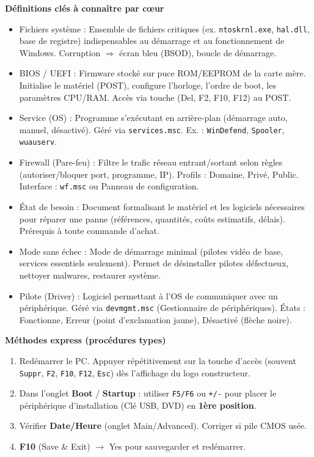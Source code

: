 \documentclass[11pt]{article}
\newcommand{\cle}[1]{{\popxbold\color{popdark}#1}}
\newcounter{popsec}
\newcounter{popsub}
\newcommand{\courssub}[1]{%
  \stepcounter{popsub}%
  \par\vspace{9pt}\noindent{\popxbold\fontsize{11.5}{13}\selectfont\color{popink}{\color{poporange}\thepopsec.\thepopsub}\hspace{6pt}#1}\par\nopagebreak\vspace{4pt}
}
\begin{document}
\courssub{Bilan synthétique}

\begin{bilan}

\textbf{Définitions clés à connaître par cœur}
\begin{itemize}
    \item \cle{Fichiers système} : Ensemble de fichiers critiques (ex. \texttt{ntoskrnl.exe}, \texttt{hal.dll}, base de registre) indispensables au démarrage et au fonctionnement de Windows. Corruption $\Rightarrow$ écran bleu (BSOD), boucle de démarrage.
    \item \cle{BIOS / UEFI} : Firmware stocké sur puce ROM/EEPROM de la carte mère. Initialise le matériel (POST), configure l'horloge, l'ordre de boot, les paramètres CPU/RAM. Accès via touche (Del, F2, F10, F12) au POST.
    \item \cle{Service (OS)} : Programme s'exécutant en arrière-plan (démarrage auto, manuel, désactivé). Géré via \texttt{services.msc}. Ex. : \texttt{WinDefend}, \texttt{Spooler}, \texttt{wuauserv}.
    \item \cle{Firewall (Pare-feu)} : Filtre le trafic réseau entrant/sortant selon règles (autoriser/bloquer port, programme, IP). Profils : Domaine, Privé, Public. Interface : \texttt{wf.msc} ou Panneau de configuration.
    \item \cle{État de besoin} : Document formalisant le matériel et les logiciels nécessaires pour réparer une panne (références, quantités, coûts estimatifs, délais). Prérequis à toute commande d'achat.
    \item \cle{Mode sans échec} : Mode de démarrage minimal (pilotes vidéo de base, services essentiels seulement). Permet de désinstaller pilotes défectueux, nettoyer malwares, restaurer système.
    \item \cle{Pilote (Driver)} : Logiciel permettant à l'OS de communiquer avec un périphérique. Géré via \texttt{devmgmt.msc} (Gestionnaire de périphériques). États : Fonctionne, Erreur (point d'exclamation jaune), Désactivé (flèche noire).
\end{itemize}

\textbf{Méthodes express (procédures types)}

\begin{methode}
\begin{enumerate}    \item Redémarrer le PC. Appuyer répétitivement sur la touche d'accès (souvent \texttt{Suppr}, \texttt{F2}, \texttt{F10}, \texttt{F12}, \texttt{Esc}) dès l'affichage du logo constructeur.
    \item Dans l'onglet \textbf{Boot} / \textbf{Startup} : utiliser \texttt{F5/F6} ou \texttt{+/-} pour placer le périphérique d'installation (Clé USB, DVD) en \textbf{1ère position}.
    \item Vérifier \textbf{Date/Heure} (onglet Main/Advanced). Corriger si pile CMOS usée.
    \item \textbf{F10} (Save \& Exit) $\rightarrow$ Yes pour sauvegarder et redémarrer.
\end{enumerate}
\end{methode}


\end{bilan}
\end{document}
